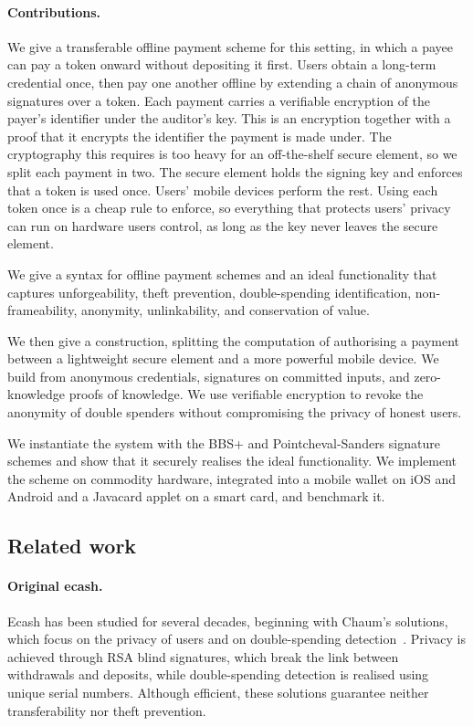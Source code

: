 \paragraph{Contributions.} We give a transferable offline payment scheme for
this setting, in which a payee can pay a token onward without depositing it
first. Users obtain a long-term credential once, then pay one another offline
by extending a chain of anonymous signatures over a token. Each payment carries
a verifiable encryption of the payer's identifier under the auditor's key. This
is an encryption together with a proof that it encrypts the identifier the
payment is made under. The cryptography this requires is too heavy for an
off-the-shelf secure element, so we split each payment in two. The secure
element holds the signing key and enforces that a token is used once. Users'
mobile devices perform the rest. Using each token once is a cheap rule to
enforce, so everything that protects users' privacy can run on hardware users
control, as long as the key never leaves the secure element.

We give a syntax for offline payment schemes and an ideal functionality that
captures unforgeability, theft prevention, double-spending identification,
non-frameability, anonymity, unlinkability, and conservation of value.

We then give a construction, splitting the computation of authorising a payment
between a lightweight secure element and a more powerful mobile device. We
build from anonymous credentials, signatures on committed inputs, and
zero-knowledge proofs of knowledge. We use verifiable encryption to revoke the
anonymity of double spenders without compromising the privacy of honest users.

We instantiate the system with the BBS+ and Pointcheval-Sanders signature
schemes and show that it securely realises the ideal functionality. We
implement the scheme on commodity hardware, integrated into a mobile wallet on
iOS and Android and a Javacard applet on a smart card, and benchmark it.

\subsection*{Related work}

\paragraph{Original ecash.} Ecash has been studied for several decades,
beginning with Chaum's solutions, which focus on the privacy of users and on
double-spending detection~\cite{C:Chaum82,C:ChaFiaNao88}. Privacy is achieved
through RSA blind signatures, which break the link between withdrawals and
deposits, while double-spending detection is realised using unique serial
numbers. Although efficient, these solutions guarantee neither transferability
nor theft prevention.

